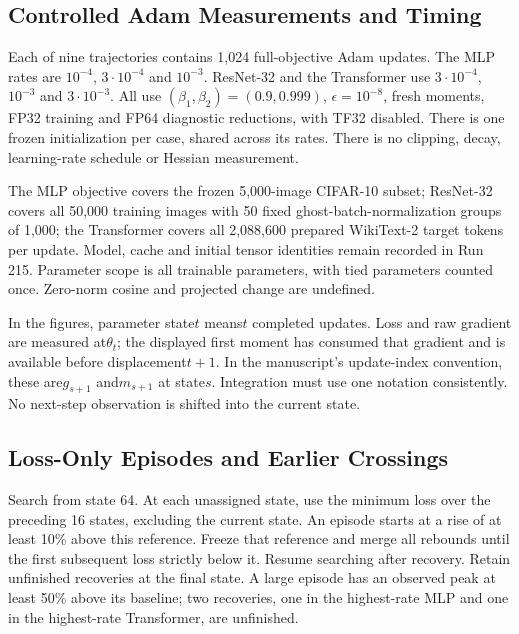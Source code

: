 \subsection{Controlled Adam Measurements and Timing}

Each of nine trajectories contains 1,024 full-objective Adam updates. The MLP
rates are $10^{-4}$, $3\cdot 10^{-4}$ and $10^{-3}$. ResNet-32 and the Transformer
use $3\cdot 10^{-4}$, $10^{-3}$ and $3\cdot 10^{-3}$.
All use $(\beta_1,\beta_2)=(0.9,0.999)$, $\epsilon=10^{-8}$, fresh moments,
FP32 training and FP64 diagnostic reductions, with TF32 disabled. There is
one frozen initialization per case, shared across its rates. There is no
clipping, decay, learning-rate schedule or Hessian measurement.

The MLP objective covers the frozen 5,000-image CIFAR-10 subset; ResNet-32
covers all 50,000 training images with 50 fixed ghost-batch-normalization
groups of 1,000; the Transformer covers all 2,088,600 prepared WikiText-2 target
tokens per update. Model, cache and initial tensor identities remain recorded
in Run 215. Parameter scope is all trainable parameters, with tied parameters
counted once. Zero-norm cosine and projected change are undefined.

In the figures, parameter state$t$ means$t$ completed updates. Loss and raw
gradient are measured at$\theta_t$; the displayed first moment has consumed
that gradient and is available before displacement$t+1$. In the manuscript's
update-index convention, these are$g_{s+1}$ and$m_{s+1}$ at state$s$. Integration
must use one notation consistently. No next-step observation is shifted into
the current state.

\subsection{Loss-Only Episodes and Earlier Crossings}

Search from state 64. At each unassigned state, use the minimum loss over the
preceding 16 states, excluding the current state. An episode starts at a rise
of at least 10\% above this reference. Freeze that reference and merge all
rebounds until the first subsequent loss strictly below it. Resume searching
after recovery. Retain unfinished recoveries at the final state. A large
episode has an observed peak at least 50\% above its baseline; two recoveries,
one in the highest-rate MLP and one in the highest-rate Transformer, are unfinished.

